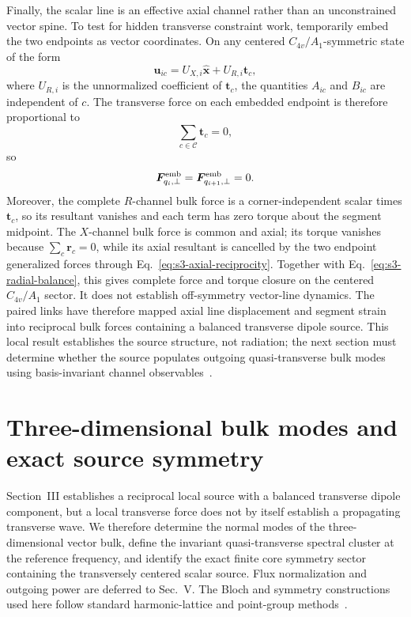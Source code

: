 \documentclass[10pt,aps,pre,reprint,floatfix,notitlepage,nofootinbib]{revtex4-2}
\newcommand{\vu}{\bm{u}}
\newcommand{\vF}{\bm{F}}
\newcommand{\vrr}{\bm{r}}
\newcommand{\vt}{\bm{t}}
\newcommand{\ex}{\hat{\bm{x}}}
\newcommand{\Cc}{\mathcal C}
\begin{document}
Finally, the scalar line is an effective axial channel rather than an unconstrained vector spine.  To test for hidden transverse constraint work, temporarily embed the two endpoints as vector coordinates.  On any centered $C_{4v}/A_1$-symmetric state of the form
\begin{equation}
  \vu_{ic}=U_{X,i}\ex+U_{R,i}\vt_c,
  \label{eq:s3-A1-state}
\end{equation}
where $U_{R,i}$ is the unnormalized coefficient of $\vt_c$, the quantities $A_{ic}$ and $B_{ic}$ are independent of $c$.  The transverse force on each embedded endpoint is therefore proportional to
\begin{equation}
  \sum_{c\in\Cc}\vt_c=0,
  \label{eq:s3-sign-sum}
\end{equation}
so
\begin{equation}
  \vF^{\rm emb}_{q_i,\perp}
  =\vF^{\rm emb}_{q_{i+1},\perp}=0.
  \label{eq:s3-embedded-reaction}
\end{equation}
Moreover, the complete $R$-channel bulk force is a corner-independent scalar times $\vt_c$, so its resultant vanishes and each term has zero torque about the segment midpoint. The $X$-channel bulk force is common and axial; its torque vanishes because $\sum_c\vrr_c=0$, while its axial resultant is cancelled by the two endpoint generalized forces through Eq.~\eqref{eq:s3-axial-reciprocity}. Together with Eq.~\eqref{eq:s3-radial-balance}, this gives complete force and torque closure on the centered $C_{4v}/A_1$ sector.  It does not establish off-symmetry vector-line dynamics.  The paired links have therefore mapped axial line displacement and segment strain into reciprocal bulk forces containing a balanced transverse dipole source.  This local result establishes the source structure, not radiation; the next section must determine whether the source populates outgoing quasi-transverse bulk modes using basis-invariant channel observables~\cite{Ong2018,Khodavirdi2024}.

\section{Three-dimensional bulk modes and exact source symmetry}
\label{sec:s4-bulk-symmetry}

Section~III establishes a reciprocal local source with a balanced transverse dipole component, but a local transverse force does not by itself establish a propagating transverse wave. We therefore determine the normal modes of the three-dimensional vector bulk, define the invariant quasi-transverse spectral cluster at the reference frequency, and identify the exact finite core symmetry sector containing the transversely centered scalar source. Flux normalization and outgoing power are deferred to Sec.~V.  The Bloch and symmetry constructions used here follow standard harmonic-lattice and point-group methods~\cite{BornHuang1954,Maradudin1971,Dresselhaus2008}.
\end{document}
